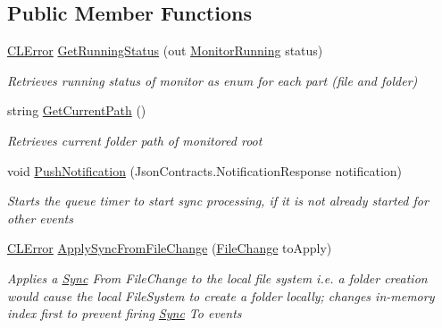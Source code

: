 \subsection*{Public Member Functions}
\begin{DoxyCompactItemize}
\item 
\hyperlink{class_cloud_api_public_1_1_model_1_1_c_l_error}{C\-L\-Error} \hyperlink{class_cloud_api_public_1_1_file_monitor_1_1_monitor_agent_a0f023e1a476bfc4c903a7904c599404f}{Get\-Running\-Status} (out \hyperlink{namespace_cloud_api_public_1_1_static_a502726756c6bc84b5c9bcaf23c3a8d28}{Monitor\-Running} status)
\begin{DoxyCompactList}\small\item\em Retrieves running status of monitor as enum for each part (file and folder) \end{DoxyCompactList}\item 
string \hyperlink{class_cloud_api_public_1_1_file_monitor_1_1_monitor_agent_a4f8355a65a49af520f5bad5e012d6005}{Get\-Current\-Path} ()
\begin{DoxyCompactList}\small\item\em Retrieves current folder path of monitored root \end{DoxyCompactList}\item 
void \hyperlink{class_cloud_api_public_1_1_file_monitor_1_1_monitor_agent_a75c1ea853f4abeb5de7f9b35f580ec15}{Push\-Notification} (Json\-Contracts.\-Notification\-Response notification)
\begin{DoxyCompactList}\small\item\em Starts the queue timer to start sync processing, if it is not already started for other events \end{DoxyCompactList}\item 
\hyperlink{class_cloud_api_public_1_1_model_1_1_c_l_error}{C\-L\-Error} \hyperlink{class_cloud_api_public_1_1_file_monitor_1_1_monitor_agent_ab8da6ab644491bd7372af1ff829e671d}{Apply\-Sync\-From\-File\-Change} (\hyperlink{class_cloud_api_public_1_1_model_1_1_file_change}{File\-Change} to\-Apply)
\begin{DoxyCompactList}\small\item\em Applies a \hyperlink{namespace_cloud_api_public_1_1_sync}{Sync} From File\-Change to the local file system i.\-e. a folder creation would cause the local File\-System to create a folder locally; changes in-\/memory index first to prevent firing \hyperlink{namespace_cloud_api_public_1_1_sync}{Sync} To events \end{DoxyCompactList}\item 

\end{DoxyCompactItemize}
